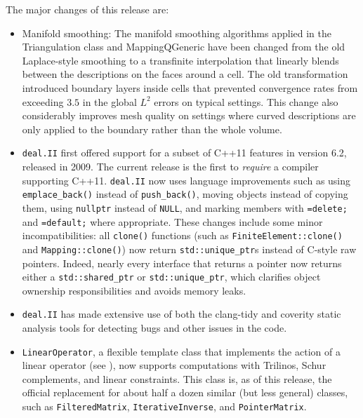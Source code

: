 \documentclass{ansarticle-preprint}
\newcommand{\specialword}[1]{\texttt{#1}}
\newcommand{\dealii}{{\specialword{deal.II}}}
\begin{document}
The major changes of this release are:
\begin{itemize}
\item
  Manifold smoothing: The manifold smoothing algorithms applied in the
  Triangulation class and MappingQGeneric have been changed from the old
  Laplace-style smoothing to a transfinite interpolation that linearly
  blends between the descriptions on the faces around a cell. The old
  transformation introduced boundary layers inside cells that prevented
  convergence rates from exceeding \(3.5\) in the global \(L^2\) errors on typical
  settings. This change also considerably improves mesh quality on settings
  where curved descriptions are only applied to the boundary rather than
  the whole volume.

\item
  \dealii{} first offered support for a subset of C++11 features in
  version 6.2, released in 2009. The current release is the first to \emph{require} a compiler
  supporting C++11. \dealii{} now uses language improvements such as using
  \texttt{emplace\_back()} instead of \texttt{push\_back()}, moving objects
  instead of copying them, using \texttt{nullptr} instead of \texttt{NULL}, and
  marking members with \texttt{=delete;} and \texttt{=default;} where
  appropriate. These changes include some minor incompatibilities: all
  \texttt{clone()} functions (such as \texttt{FiniteElement::clone()} and
  \texttt{Mapping::clone()}) now return \texttt{std::unique\_ptr}s instead of
  C-style raw pointers. Indeed, nearly every interface that returns a pointer
  now returns either a \texttt{std::shared\_ptr} or \texttt{std::unique\_ptr},
  which clarifies object ownership responsibilities and avoids memory leaks.

\item \dealii{} has made extensive use of both the clang-tidy and coverity
      static analysis tools for detecting bugs and other issues in the code.

\item
  \texttt{LinearOperator}, a flexible template class that implements the action of a
  linear operator (see \cite{MaierBardelloniHeltai-2016-b}), now supports
  computations with Trilinos, Schur complements, and linear constraints. This
  class is, as of this release, the official replacement for about half a dozen
  similar (but less general) classes, such as \texttt{FilteredMatrix},
  \texttt{IterativeInverse}, and \texttt{PointerMatrix}.


\end{itemize}
\end{document}
